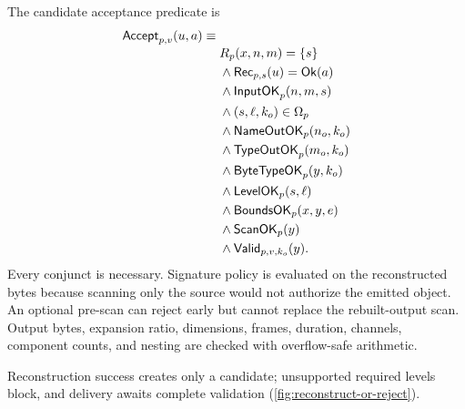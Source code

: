 The candidate acceptance predicate is
\begin{equation}
\begin{aligned}
  \mathsf{Accept}_{p,v}(u,a) \equiv {}& \\[-0.6ex]
  &R_p(x,n,m)=\{s\} \\
  &\land \mathsf{Rec}_{p,s}(u)=\mathsf{Ok}(a) \\
  &\land \mathsf{InputOK}_p(n,m,s) \\
  &\land (s,\ell,k_o)\in\Omega_p \\
  &\land \mathsf{NameOutOK}_p(n_o,k_o) \\
  &\land \mathsf{TypeOutOK}_p(m_o,k_o) \\
  &\land \mathsf{ByteTypeOK}_p(y,k_o) \\
  &\land \mathsf{LevelOK}_p(s,\ell) \\
  &\land \mathsf{BoundsOK}_p(x,y,e) \\
  &\land \mathsf{ScanOK}_p(y) \\
  &\land \mathsf{Valid}_{p,v,k_o}(y).
\end{aligned}
\label{eq:extended-acceptance}
\end{equation}
Every conjunct is necessary. Signature policy is evaluated on the reconstructed
bytes because scanning only the source would not authorize the emitted object.
An optional pre-scan can reject early but cannot replace the rebuilt-output
scan. Output bytes, expansion ratio, dimensions, frames, duration, channels,
component counts, and nesting are checked with overflow-safe arithmetic.

Reconstruction success creates only a candidate; unsupported required levels
block, and delivery awaits complete validation
(\cref{fig:reconstruct-or-reject}).

